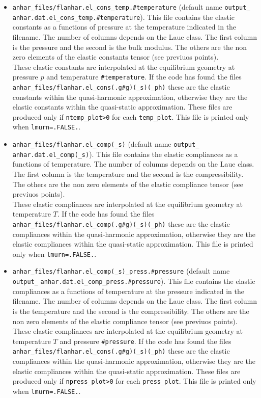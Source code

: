 \documentclass[12pt,a4paper,twoside]{report}
\begin{document}
\begin{itemize}
\item
\texttt{anhar\_files/flanhar.el\_cons\_temp.\#temperature}
(default name \texttt{output\_} 
\texttt{anhar.dat.el\_cons\_temp.\#temperature}). 
This file contains the elastic constants as a functions of pressure
at the temperature indicated in the filename. The number
of columns depends on the Laue class. The first column is the 
pressure and the second is the bulk modulus. The others are the
non zero elements of the elastic constants tensor (see previuos points). \\ 
These elastic constants are interpolated at the equilibrium geometry at
pressure $p$ and temperature \texttt{\#temperature}. If the code has found 
the files 
\texttt{anhar\_files/flanhar.el\_cons(.g\#g)(\_s)(\_ph)} these are
the elastic constants within the quasi-harmonic approximation, otherwise
they are the elastic constants within the quasi-static approximation.
These files are produced only if \texttt{ntemp\_plot>0} for each
\texttt{temp\_plot}. 
This file is printed only when \texttt{lmurn=.FALSE.}.

\item
\texttt{anhar\_files/flanhar.el\_comp(\_s)}
(default name \texttt{output\_} \texttt{anhar.dat.el\_comp(\_s)}). 
This file
contains the elastic compliances as a functions of temperature. The number
of columns depends on the Laue class. The first column is the 
temperature and the second is the compressibility. The others are the
non zero elements of the elastic compliance tensor (see previuos points). \\ 
These elastic compliances are interpolated at the equilibrium geometry at
temperature $T$. If the code has found the files 
\texttt{anhar\_files/flanhar.el\_comp(.g\#g)(\_s)(\_ph)} these are
the elastic compliances within the quasi-harmonic approximation, otherwise
they are the elastic compliances within the quasi-static approximation.
This file is printed only when \texttt{lmurn=.FALSE.}.

\item
\texttt{anhar\_files/flanhar.el\_comp(\_s)\_press.\#pressure}
(default name \texttt{output\_} 
\texttt{anhar.dat.el\_comp\_press.\#pressure}). 
This file contains the elastic compliances as a functions of temperature
at the pressure indicated in the filename. The number
of columns depends on the Laue class. The first column is the 
temperature and the second is the compressibility. The others are the
non zero elements of the elastic compliance tensor (see previuos points). \\ 
These elastic compliances are interpolated at the equilibrium geometry at
temperature $T$ and pressure \texttt{\#pressure}. If the code has found 
the files 
\texttt{anhar\_files/flanhar.el\_cons(.g\#g)(\_s)(\_ph)} these are
the elastic compliances within the quasi-harmonic approximation, otherwise
they are the elastic compliances within the quasi-static approximation.
These files are produced only if \texttt{npress\_plot>0} for each
\texttt{press\_plot}.  
This file is printed only when \texttt{lmurn=.FALSE.}.


\end{itemize}
\end{document}
